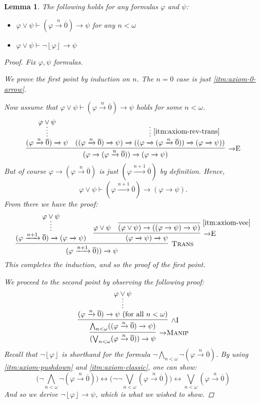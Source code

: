 \documentclass{amsart}
\newtheorem{lemma}[theorem]{Lemma}
\theoremstyle{definition}
\numberwithin{equation}{theorem}
\renewcommand{\phi}{\varphi}
\newcommand{\unwedge}{{\wedge}}
\newcommand{\proves}{\vdash}
\newcommand{\strict}[1]{{\left\lfloor#1\right\rfloor}}
\newcommand{\rat}[1]{{\overline{#1}}}
\newcommand{\narrow}[1]{\xrightarrow{#1}}
\renewcommand{\to}{\narrow{}}
\newcommand{\arr}{{\to}}
\newcommand{\intro}{\!\operatorname{I}}
\newcommand{\elim}{\!\operatorname{E}}
\newcommand{\trans}{\text{\sc{Trans}}}
\newcommand{\aref}[1]{\!\text{\ref{itm:axiom-#1}}}
\newcommand{\pushdown}{\arr\text{\sc{Manip}}}
\begin{document}
\begin{lemma}\label{lem:vee-with-strict}
  The following holds for any formulas $\phi$ and $\psi$:
  \begin{itemize}
  \item $\phi\vee\psi\proves(\phi\narrow n\rat 0)\to\psi$ for any $n<\omega$
  \item $\phi\vee\psi\proves\neg\strict\phi\to\psi$
  \end{itemize}
  \begin{proof}    
    Fix $\phi,\psi$ formulas.
    
    We prove the first point by induction on $n$.
    The $n=0$ case is just \ref{itm:axiom-0-arrow}.
    
    Now assume that $\phi\vee\psi\proves(\phi\narrow n\rat 0)\to\psi$ holds for some $n<\omega$.
    \[
      \infer[\arr\elim]{(\phi\to(\phi\narrow{n}\rat 0))\to(\phi\to\psi)}{
        \infer*{(\phi\narrow n\rat 0)\to\psi}{\phi\vee\psi} &
        \infer*[\aref{rev-trans}]{((\phi\narrow n\rat 0)\to\psi)\to((\phi\to(\phi\narrow{n}\rat 0))\to(\phi\to\psi))}{}
      }
    \]
    But of course $\phi\to(\phi\narrow n\rat 0)$ is just $(\phi\narrow{n+1}\rat 0)$ by definition.
    Hence,
    \[
      \phi\vee\psi\proves(\phi\narrow{n+1}\rat 0)\to(\phi\to\psi).
    \]
    From there we have the proof:
    \[
      \infer[\trans]{(\phi\narrow{n+1}\rat 0))\to\psi}{
        \infer*{(\phi\narrow{n+1}\rat 0)\to(\phi\to\psi)}{\phi\vee\psi} &
        \infer[\arr\elim]{(\phi\to\psi)\to\psi}{
          \phi\vee\psi &
          \infer[\aref{vee}]{(\phi\vee\psi)\to((\phi\to\psi)\to\psi)}{}
        }
      }
    \]
    This completes the induction, and so the proof of the first point.
    
    We proceed to the second point by observing the following proof:
    \[
      \infer[\pushdown]{(\bigvee_{n<\omega}(\phi\narrow n\rat 0))\to\psi}{
        \infer[\unwedge\intro]{\bigwedge_{n<\omega}((\phi\narrow n\rat 0)\to\psi)}{
		      \infer*{(\phi\narrow n\rat 0)\to\psi\text{ (for all $n<\omega$)}}{\phi\vee\psi}
	      }
      }
    \]
    Recall that $\neg\strict\phi$ is shorthand for the formula $\neg\bigwedge_{n<\omega}\neg(\phi\narrow n\rat0)$.
    By using \ref{itm:axiom-pushdown} and \ref{itm:axiom-classic}, one can show:
    \[
      \Big(\neg\bigwedge_{n<\omega}\neg(\phi\narrow n\rat0)\Big)\leftrightarrow\Big(\neg\neg\bigvee_{n<\omega}(\phi\narrow n\rat 0)\Big)\leftrightarrow\bigvee_{n<\omega}(\phi\narrow n\rat 0)
    \]
    And so we derive $\neg\strict\phi\to\psi$, which is what we wished to show.
  \end{proof}
\end{lemma}
\end{document}
